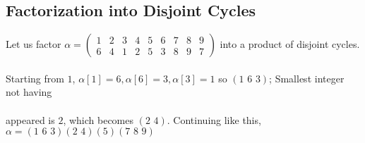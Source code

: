 \documentclass{article}
\begin{document}
\subsection{Factorization into Disjoint Cycles}
Let us factor \(\alpha=\begin{pmatrix}1 & 2 & 3 & 4 & 5 & 6 & 7 & 8 & 9\\6 & 4 & 1 & 2 & 5 & 3 & 8 & 9 & 7\end{pmatrix}\) into a product of disjoint cycles.\\\\
Starting from \(1\), \(\alpha[1]=6,\alpha[6]=3,\alpha[3]=1\) so \((1\,\,6\,\,3)\); Smallest integer not having\\\\
appeared is \(2\), which becomes \((2\,\,4)\). Continuing like this, \(\alpha=(1\,\,6\,\,3)(2\,\,4)(5)(7\,\,8\,\,9)\)\\\\
\end{document}

